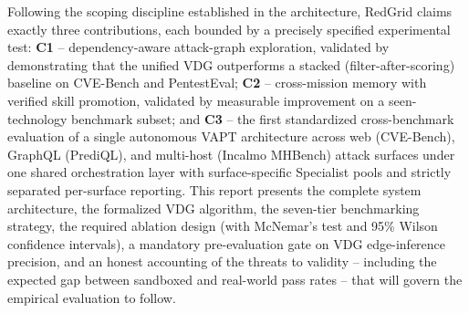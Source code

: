 \vspace{0.3cm}
\hspace{1cm} Following the scoping discipline established in the architecture, RedGrid claims exactly three contributions, each bounded by a precisely specified experimental test: \textbf{C1} -- dependency-aware attack-graph exploration, validated by demonstrating that the unified VDG outperforms a stacked (filter-after-scoring) baseline on CVE-Bench and PentestEval; \textbf{C2} -- cross-mission memory with verified skill promotion, validated by measurable improvement on a seen-technology benchmark subset; and \textbf{C3} -- the first standardized cross-benchmark evaluation of a single autonomous VAPT architecture across web (CVE-Bench), GraphQL (PrediQL), and multi-host (Incalmo MHBench) attack surfaces under one shared orchestration layer with surface-specific Specialist pools and strictly separated per-surface reporting. This report presents the complete system architecture, the formalized VDG algorithm, the seven-tier benchmarking strategy, the required ablation design (with McNemar's test and 95\% Wilson confidence intervals), a mandatory pre-evaluation gate on VDG edge-inference precision, and an honest accounting of the threats to validity -- including the expected gap between sandboxed and real-world pass rates -- that will govern the empirical evaluation to follow.
